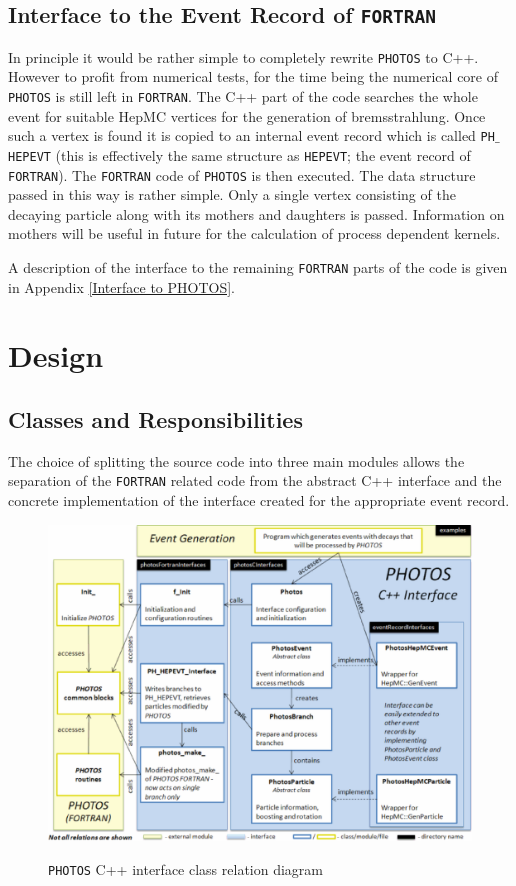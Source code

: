 \documentclass[]{Photos_interface_design}
\begin{document}
\subsection{Interface to the Event Record of {\tt FORTRAN}}
\label{sect:F77fill}

In principle it would be rather simple to completely rewrite {\tt PHOTOS} to
C++. However to profit from numerical tests, for the time being the numerical core of {\tt PHOTOS}
is still left in {\tt FORTRAN}. The C++ part of the code searches the whole event for
suitable HepMC vertices for the generation of bremsstrahlung. Once such
a vertex is found it is copied to an internal event record  which is 
called  {\tt PH$\_$HEPEVT} (this is effectively the same structure as {\tt HEPEVT};
the event record of {\tt FORTRAN}).
The {\tt FORTRAN} code of {\tt PHOTOS} is then executed.
The data structure passed in this way is rather simple. Only a single vertex consisting
of the decaying particle along with its mothers and daughters is passed. Information 
on mothers will be useful in future for the calculation of process dependent 
kernels.



A description of the interface to the remaining {\tt FORTRAN} parts of the code is
given in  Appendix \ref{Interface to PHOTOS}.


\section{Design}
\label{sec:design}
\subsection{Classes and Responsibilities}

The choice of splitting the source code into three main modules
 allows the separation of the {\tt FORTRAN} related code from the abstract C++ interface
and the concrete implementation of the interface created for the appropriate
event record.

\begin{figure}[h!]
\centering
\includegraphics[scale=0.6]{interface_design.eps}
\label{fig:design}
\caption{{\tt PHOTOS} C++ interface class relation diagram}
\end{figure}
\end{document}
